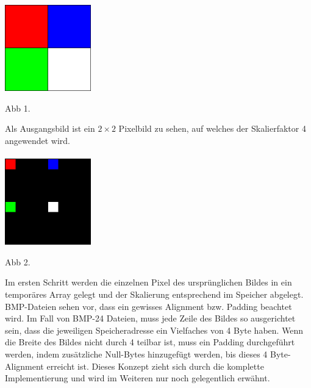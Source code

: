\documentclass[course=erap]{aspdoc}
\begin{document}
\centering
\includegraphics[width=0.28\textwidth]{2x2_1015.png} 
\begin{center}
\vspace{-0.5em}
  Abb 1.
\vspace{-0.5em}
\end{center}
\justify

Als Ausgangsbild ist ein $2 \times 2$ Pixelbild zu sehen, auf welches der Skalierfaktor 4 angewendet wird.\\\\

\centering
\includegraphics[width=0.28\textwidth]{2x2_1.png} 
\begin{center}
\vspace{-0.5em}
  Abb 2.
\vspace{0.5em}
\end{center}
\justify

Im ersten Schritt werden die einzelnen Pixel des ursprünglichen Bildes in ein temporäres Array gelegt und der Skalierung entsprechend im Speicher abgelegt. BMP-Dateien sehen vor, dass ein gewisses Alignment bzw. Padding beachtet wird. Im Fall von BMP-24 Dateien, muss jede Zeile des Bildes so ausgerichtet sein, dass die jeweiligen Speicheradresse ein Vielfaches von 4 Byte haben. Wenn die Breite des Bildes nicht durch 4 teilbar ist, muss ein Padding durchgeführt werden, indem zusätzliche Null-Bytes hinzugefügt werden, bis dieses 4 Byte-Alignment erreicht ist. Dieses Konzept zieht sich durch die komplette Implementierung und wird im Weiteren nur noch gelegentlich erwähnt.\\

\pagebreak
\end{document}

